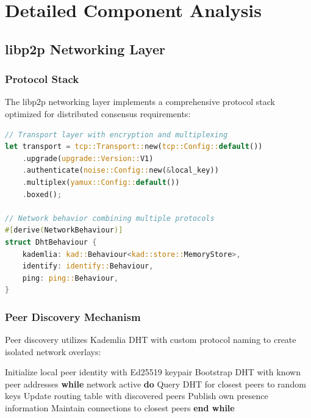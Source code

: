 \documentclass[11pt,a4paper]{article}
\theoremstyle{definition}
\theoremstyle{remark}
\begin{document}
\section{Detailed Component Analysis}

\subsection{libp2p Networking Layer}

\subsubsection{Protocol Stack}

The libp2p networking layer implements a comprehensive protocol stack optimized for distributed consensus requirements:

\begin{lstlisting}[language=Rust, caption=libp2p Protocol Configuration]
// Transport layer with encryption and multiplexing
let transport = tcp::Transport::new(tcp::Config::default())
    .upgrade(upgrade::Version::V1)
    .authenticate(noise::Config::new(&local_key))
    .multiplex(yamux::Config::default())
    .boxed();

// Network behavior combining multiple protocols
#[derive(NetworkBehaviour)]
struct DhtBehaviour {
    kademlia: kad::Behaviour<kad::store::MemoryStore>,
    identify: identify::Behaviour,
    ping: ping::Behaviour,
}
\end{lstlisting}

\subsubsection{Peer Discovery Mechanism}

Peer discovery utilizes Kademlia DHT with custom protocol naming to create isolated network overlays:

\begin{algorithm}
\caption{libp2p Peer Discovery}
\begin{algorithmic}[1]
\STATE Initialize local peer identity with Ed25519 keypair
\STATE Bootstrap DHT with known peer addresses
\STATE \textbf{while} network active \textbf{do}
    \STATE Query DHT for closest peers to random keys
    \STATE Update routing table with discovered peers
    \STATE Publish own presence information
    \STATE Maintain connections to closest peers
\STATE \textbf{end while}
\end{algorithmic}
\end{algorithm}
\end{document}
